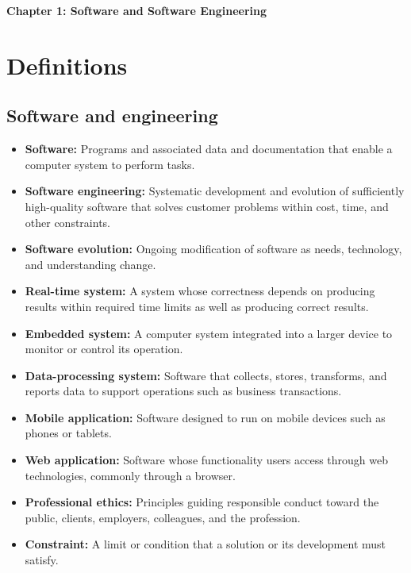 \documentclass[11pt]{article}
\newcommand{\Title}[1]{%
  \begin{center}
    \fontsize{16}{28}\selectfont\textbf{#1}
  \end{center}
}
\newenvironment{DottedList}{%
  \begin{itemize}[leftmargin=2em, itemsep=0.35em, topsep=0.35em, label=\textbullet]
}{%
  \end{itemize}
}
\begin{document}
\Title{Chapter 1: Software and Software Engineering}
\section*{Definitions}
\subsection*{Software and engineering}
\begin{DottedList}
  \item \textbf{Software:} Programs and associated data and documentation that enable a computer system to perform tasks.
  \item \textbf{Software engineering:} Systematic development and evolution of sufficiently high-quality software that solves customer problems within cost, time, and other constraints.
  \item \textbf{Software evolution:} Ongoing modification of software as needs, technology, and understanding change.
  \item \textbf{Real-time system:} A system whose correctness depends on producing results within required time limits as well as producing correct results.
  \item \textbf{Embedded system:} A computer system integrated into a larger device to monitor or control its operation.
  \item \textbf{Data-processing system:} Software that collects, stores, transforms, and reports data to support operations such as business transactions.
  \item \textbf{Mobile application:} Software designed to run on mobile devices such as phones or tablets.
  \item \textbf{Web application:} Software whose functionality users access through web technologies, commonly through a browser.
  \item \textbf{Professional ethics:} Principles guiding responsible conduct toward the public, clients, employers, colleagues, and the profession.
  \item \textbf{Constraint:} A limit or condition that a solution or its development must satisfy.
\end{DottedList}
\end{document}
